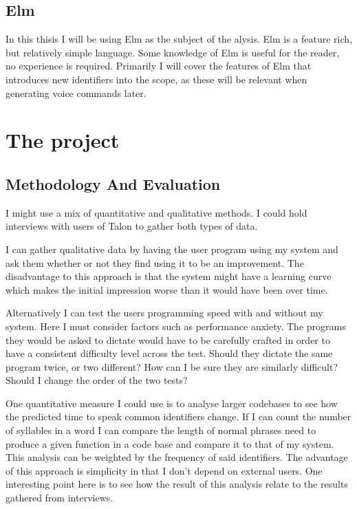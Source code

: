 \documentclass[a4paper,english]{ifimaster}
\begin{document}
\section{Elm}
In this thisis I will be using Elm as the subject of the alysis.
Elm is a feature rich, but relatively simple language.
Some knowledge of Elm is useful for the reader, no experience is required.
Primarily I will cover the features of Elm that introduces new identifiers into the scope,
as these will be relevant when generating voice commands later.

\chapter{The project}

\section{Methodology And Evaluation}
I might use a mix of quantitative and qualitative methods.
I could hold interviews with users of Talon to gather both types of data.

I can gather qualitative data by having the user program using my system and ask them whether or not they find using it to be an improvement.
The disadvantage to this approach is that the system might have a learning curve which makes the initial impression
worse than it would have been over time.

Alternatively I can test the users programming speed with and without my system.
Here I must consider factors such as performance anxiety.
The programs they would be asked to dictate would have to be carefully crafted in order to have a consistent difficulty level
across the test. 
Should they dictate the same program twice, or two different? How can I be sure they are similarly difficult?
Should I change the order of the two tests?

One quantitative measure I could use is to analyse larger codebases to see how the predicted time to speak common identifiers change.
If I can count the number of syllables in a word I can compare the length of normal phrases need to produce a given function in a code base and compare
it to that of my system. This analysis can be weighted by the frequency of said identifiers.
The advantage of this approach is simplicity in that I don't depend on external users.
One interesting point here is to see how the result of this analysis relate to the results gathered from interviews.



\backmatter{}
\printbibliography{}
\end{document}
